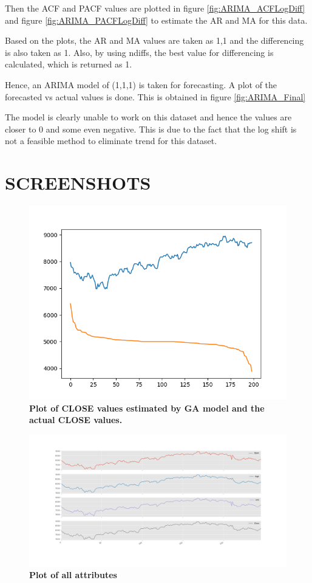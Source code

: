 \documentclass[BTech]{srmuthesis}
\begin{document}
Then the ACF and PACF values are plotted in figure \ref{fig:ARIMA_ACFLogDiff} and figure \ref{fig:ARIMA_PACFLogDiff} to estimate the AR and MA for this data.

Based on the plots, the AR and MA values are taken as 1,1 and the differencing is also taken as 1. Also, by using ndiffs, the best value for differencing is calculated, which is returned as 1.

Hence, an ARIMA model of (1,1,1) is taken for forecasting. A plot of the forecasted vs actual values is done. This is obtained in figure \ref{fig:ARIMA_Final}

The model is clearly unable to work on this dataset and hence the values are closer to 0 and some even negative. This is due to the fact that the log shift is not a feasible method to eliminate trend for this dataset. \pagebreak

\chapter{SCREENSHOTS}

\begin{figure}[H]
	\centering
	\includegraphics[width=\linewidth]{GA_MPFinal.png}
	\caption{\bf Plot of CLOSE values estimated by GA model and the actual CLOSE values.}
	\label{fig:GA_MPFinal}
\end{figure}

\begin{figure}[H]
	\flushleft
	\includegraphics[width=\linewidth]{RF_Attributes.png}
	\caption{\bf Plot of all attributes}
	\label{fig:RF_Attributes}
\end{figure}
\end{document}
